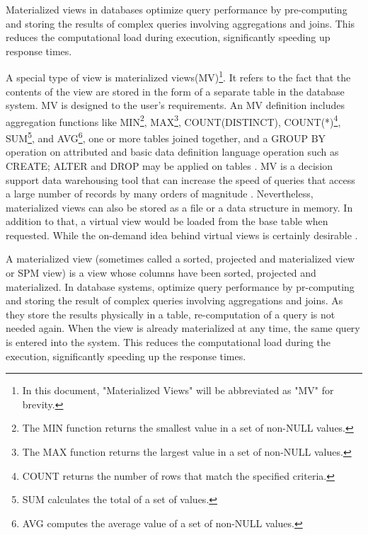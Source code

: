 Materialized views in databases optimize query performance by pre-computing and storing the results of complex queries involving aggregations and joins. This reduces the computational load during execution, significantly speeding up response times.\vspace{.4cm}

 A special type of view is materialized views(MV)\footnote{In this document, "Materialized Views" will be abbreviated as "MV" for brevity.}. It refers to the fact that the contents of the view are stored in the form of a separate table in the database system. MV is designed to the user's requirements. An MV definition includes aggregation functions like MIN\footnote{The MIN function returns the smallest value in a set of non-NULL values.}, MAX\footnote{The MAX function returns the largest value in a set of non-NULL values.}, COUNT(DISTINCT), COUNT(*)\footnote{COUNT returns the number of rows that match the specified criteria.}, SUM\footnote{SUM calculates the total of a set of values.}, and AVG\footnote{AVG computes the average value of a set of non-NULL values.}, one or more tables joined together, and a GROUP BY operation on attributed and basic data definition language operation such as CREATE; ALTER and DROP may be applied on tables \cite{Kardel_Thakare}. MV is a decision support data warehousing tool that can increase the speed of queries that access a large number of records by many orders of magnitude \cite{Kishan_Sainath_no_date}. Nevertheless, materialized views can also be stored as a file or a data structure in memory. In addition to that, a virtual view would be loaded from the base table when requested. While the on-demand idea behind virtual views is certainly desirable \cite{jan-no-date,ashadevi-2024}.\vspace{.4cm}



A materialized view (sometimes called a sorted, projected and materialized view or SPM view) is a view whose columns have been sorted, projected and materialized.\cite{IBM} In database systems, optimize query performance by pr-computing and storing the result of complex queries involving aggregations and joins. As they store the results physically in a table, re-computation of a query is not needed again. When the view is already materialized at any time, the same query is entered into the system. This reduces the computational load during the execution, significantly speeding up the response times.\vspace{.4cm}

